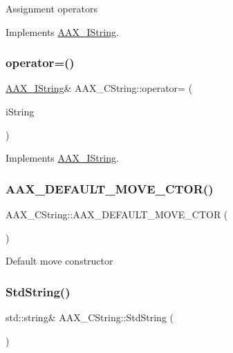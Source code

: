 Assignment operators 

Implements \mbox{\hyperlink{a01873_aaaf335636d64612714ffa93859d1a39c}{A\+A\+X\+\_\+\+I\+String}}.

\mbox{\label{a01573_a6970684024d6e230342a79057417de9b}} 
\subsubsection{\texorpdfstring{operator=()}{operator=()}\hspace{0.1cm}{\footnotesize\ttfamily [2/5]}}
{\footnotesize\ttfamily \mbox{\hyperlink{a01873}{A\+A\+X\+\_\+\+I\+String}}\& A\+A\+X\+\_\+\+C\+String\+::operator= (\begin{DoxyParamCaption}\item[{const char $\ast$}]{i\+String }\end{DoxyParamCaption})\hspace{0.3cm}{\ttfamily [virtual]}}



Implements \mbox{\hyperlink{a01873_abccb4049e229d265fdb8635342add574}{A\+A\+X\+\_\+\+I\+String}}.

\mbox{\label{a01573_ae1fe4077b3d29193d739f6504d41cb5f}} 
\subsubsection{\texorpdfstring{AAX\_DEFAULT\_MOVE\_CTOR()}{AAX\_DEFAULT\_MOVE\_CTOR()}}
{\footnotesize\ttfamily A\+A\+X\+\_\+\+C\+String\+::\+A\+A\+X\+\_\+\+D\+E\+F\+A\+U\+L\+T\+\_\+\+M\+O\+V\+E\+\_\+\+C\+T\+OR (\begin{DoxyParamCaption}\item[{\mbox{\hyperlink{a01573}{A\+A\+X\+\_\+\+C\+String}}}]{ }\end{DoxyParamCaption})}

Default move constructor \mbox{\label{a01573_a4ce07d506cd4262a5e763c7d30c30740}} 
\subsubsection{\texorpdfstring{StdString()}{StdString()}\hspace{0.1cm}{\footnotesize\ttfamily [1/2]}}
{\footnotesize\ttfamily std\+::string\& A\+A\+X\+\_\+\+C\+String\+::\+Std\+String (\begin{DoxyParamCaption}{ }\end{DoxyParamCaption})}

